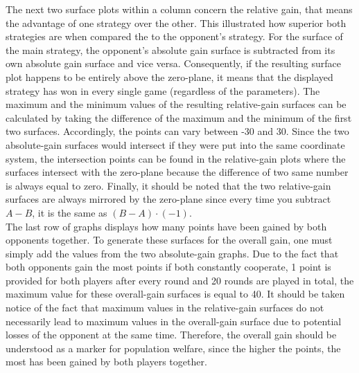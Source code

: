 \documentclass[11pt]{article}
\begin{document}
The next two surface plots within a column concern the relative gain, that means the advantage of one strategy over the other. 
This illustrated how superior both strategies are when compared the to the opponent’s strategy. 
For the surface of the main strategy, the opponent’s absolute gain surface is subtracted from its own absolute gain surface and vice versa. 
Consequently, if the resulting surface plot happens to be entirely above the zero-plane, it means that the displayed strategy has won in every single game (regardless of the parameters).
The maximum and the minimum values of the resulting relative-gain surfaces can be calculated by taking the difference of the maximum and the minimum of the first two surfaces. 
Accordingly, the points can vary between -30 and 30. 
Since the two absolute-gain surfaces would intersect if they were put into the same coordinate system, the intersection points can be found in the relative-gain plots where the surfaces intersect with the zero-plane because the difference of two same number is always equal to zero. 
Finally, it should be noted that the two relative-gain surfaces are always mirrored by the zero-plane since every time you subtract $A - B$, it is the same as $(B - A) \cdot (-1)$.\\

The last row of graphs displays how many points have been gained by both opponents together. 
To generate these surfaces for the overall gain, one must simply add the values from the two absolute-gain graphs. 
Due to the fact that both opponents gain the most points if both constantly cooperate, 1 point is provided for both players after every round and 20 rounds are played in total, the maximum value for these overall-gain surfaces is equal to 40. 
It should be taken notice of the fact that maximum values in the relative-gain surfaces do not necessarily lead to maximum values in the overall-gain surface due to potential losses of the opponent at the same time. 
Therefore, the overall gain should be understood as a marker for population welfare, since the higher the points, the most has been gained by both players together.
\end{document}
